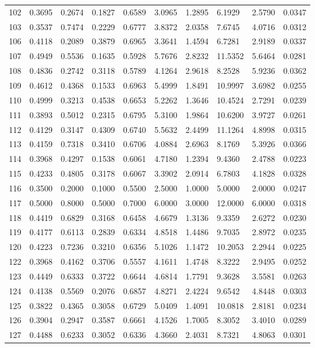 \begin{longtable}{ p{}  p{}  p{}  p{}  p{} p{}  p{} p{} p{} p{}}
102	&	0.3695	&	0.2674	&	0.1827	&	0.6589	&	3.0965	&	1.2895	&	6.1929	&	2.5790	&	0.0347	\\
103	&	0.3537	&	0.7474	&	0.2229	&	0.6777	&	3.8372	&	2.0358	&	7.6745	&	4.0716	&	0.0312	\\
106	&	0.4118	&	0.2089	&	0.3879	&	0.6965	&	3.3641	&	1.4594	&	6.7281	&	2.9189	&	0.0337	\\
107	&	0.4949	&	0.5536	&	0.1635	&	0.5928	&	5.7676	&	2.8232	&	11.5352	&	5.6464	&	0.0281	\\
108	&	0.4836	&	0.2742	&	0.3118	&	0.5789	&	4.1264	&	2.9618	&	8.2528	&	5.9236	&	0.0362	\\
109	&	0.4612	&	0.4368	&	0.1533	&	0.6963	&	5.4999	&	1.8491	&	10.9997	&	3.6982	&	0.0255	\\
110	&	0.4999	&	0.3213	&	0.4538	&	0.6653	&	5.2262	&	1.3646	&	10.4524	&	2.7291	&	0.0239	\\
111	&	0.3893	&	0.5012	&	0.2315	&	0.6795	&	5.3100	&	1.9864	&	10.6200	&	3.9727	&	0.0261	\\
112	&	0.4129	&	0.3147	&	0.4309	&	0.6740	&	5.5632	&	2.4499	&	11.1264	&	4.8998	&	0.0315	\\
113	&	0.4159	&	0.7318	&	0.3410	&	0.6706	&	4.0884	&	2.6963	&	8.1769	&	5.3926	&	0.0366	\\
114	&	0.3968	&	0.4297	&	0.1538	&	0.6061	&	4.7180	&	1.2394	&	9.4360	&	2.4788	&	0.0223	\\
115	&	0.4233	&	0.4805	&	0.3178	&	0.6067	&	3.3902	&	2.0914	&	6.7803	&	4.1828	&	0.0328	\\
116	&	0.3500	&	0.2000	&	0.1000	&	0.5500	&	2.5000	&	1.0000	&	5.0000	&	2.0000	&	0.0247	\\
117	&	0.5000	&	0.8000	&	0.5000	&	0.7000	&	6.0000	&	3.0000	&	12.0000	&	6.0000	&	0.0318	\\
118	&	0.4419	&	0.6829	&	0.3168	&	0.6458	&	4.6679	&	1.3136	&	9.3359	&	2.6272	&	0.0230	\\
119	&	0.4177	&	0.6113	&	0.2839	&	0.6334	&	4.8518	&	1.4486	&	9.7035	&	2.8972	&	0.0235	\\
120	&	0.4223	&	0.7236	&	0.3210	&	0.6356	&	5.1026	&	1.1472	&	10.2053	&	2.2944	&	0.0225	\\
122	&	0.3968	&	0.4162	&	0.3706	&	0.5557	&	4.1611	&	1.4748	&	8.3222	&	2.9495	&	0.0252	\\
123	&	0.4449	&	0.6333	&	0.3722	&	0.6644	&	4.6814	&	1.7791	&	9.3628	&	3.5581	&	0.0263	\\
124	&	0.4138	&	0.5569	&	0.2076	&	0.6857	&	4.8271	&	2.4224	&	9.6542	&	4.8448	&	0.0303	\\
125	&	0.3822	&	0.4365	&	0.3058	&	0.6729	&	5.0409	&	1.4091	&	10.0818	&	2.8181	&	0.0234	\\
126	&	0.3904	&	0.2947	&	0.3587	&	0.6661	&	4.1526	&	1.7005	&	8.3052	&	3.4010	&	0.0289	\\
127	&	0.4488	&	0.6233	&	0.3052	&	0.6336	&	4.3660	&	2.4031	&	8.7321	&	4.8063	&	0.0301	\\
\hline
\end{longtable}
